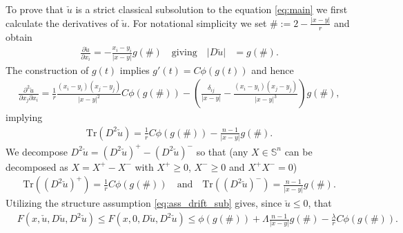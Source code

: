 \documentclass[12pt]{article}
\newcommand{\blue}{\color{blau}}
\newcounter{komcounter}
\numberwithin{komcounter}{section}
\newcommand{\komM}[1]{{\bf \blue [\refstepcounter{komcounter}\thekomcounter (by M): #1]}}
\begin{document}
To prove that $\check u$ is a strict classical subsolution to the equation \eqref{eq:main}
we first calculate the derivatives of $\check u$.
For notational simplicity we set
%
$\# := 2 - \frac{|x - y|}{r}$ %
%
and obtain
%
\begin{align*}
\frac{\partial \check u}{\partial x_i} =  -  \frac{x_i - y_i}{|x - y|} g\left(\#\right)
\quad \textrm{giving} \quad
\vert D\check u \vert &= g\left(\#\right).
\end{align*}
%
The construction of $g(t)$ implies
%
$
g'(t) = C \phi(g(t))
$
%
and hence
%
\begin{align*}
\frac{\partial^2 \check u}{\partial x_j \partial x_i}
=  \frac{1}{r}\frac{(x_i - y_i)(x_j - y_j)}{|x - y|^2}
C \phi\left(g\left(\#\right)\right)
- \left( \frac{\delta_{ij}}{|x - y|} - \frac{(x_i - y_i)(x_j - y_j)}{|x - y|^3} \right)
g\left(\#\right),
\end{align*}
%
implying
%
\begin{align*}
\text{Tr}(D^2 \check u) = \frac{1}{r} C  \phi\left(g\left(\#\right)\right) - \frac{n - 1}{|x-y|} g\left(\#\right).
\end{align*}
%
We decompose $D^2\check u = \left(D^2\check u\right)^+ - \left(D^2\check u\right)^-$ so that
(any $X \in \mathbb{S}^n$ can be decomposed as $X = X^+ - X^-$ with $X^+ \geq 0$, $X^- \geq 0$ and $X^+  X^- = 0$)
%
\begin{align*}
\text{Tr}\left( \left(D^2\check u\right)^+ \right) =  \frac{1}{r} C \phi\left(g\left(\#\right)\right) \quad \textrm{and} \quad \text{Tr}\left( \left(D^2\check u\right)^- \right) =  \frac{n - 1}{|x-y|} g\left(\#\right).
\end{align*}
%
Utilizing the structure assumption \eqref{eq:ass_drift_sub} gives, since $\check u \leq 0$, that
%
\begin{align*}%
&F(x,\check u,D\check u,D^2\check u) \leq F(x,0,D\check u,D^2\check u) \leq \phi\left(g\left(\#\right)\right)
+ \Lambda  \frac{n - 1}{|x-y|} g\left(\#\right)
-  \frac{\lambda}{r} C  \phi\left(g\left(\#\right)\right).
\end{align*}
\end{document}
